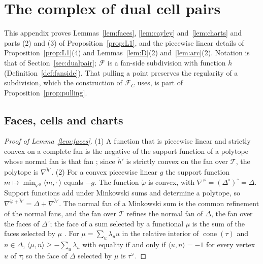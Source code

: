 \section{The complex of dual cell pairs}\label{app:legendre}

This appendix proves Lemmas~\ref{lem:faces}, \ref{lem:cayley} and~\ref{lem:charts} and parts (2) and (3) of
Proposition~\ref{prop:L1}, and the piecewise linear details of Proposition~\ref{prop:L1}(4) and Lemmas~\ref{lem:D}(2) and~\ref{lem:arc}(2). Notation is that of
Section~\ref{sec:dualpair}; $\mathcal F$ is a fan-side subdivision with function $h$ (Definition~\ref{def:fanside}). That pulling a point
preserves the regularity of a subdivision, which the construction of $\mathcal F_C$ uses, is part of
Proposition~\ref{prop:pulling}.

\subsection{Faces, cells and charts}\label{app:leg-faces}
\begin{proof}[Proof of Lemma~\ref{lem:faces}]
(1) A function that is piecewise linear and strictly convex on a complete fan is the negative of the support function of
a polytope whose normal fan is that fan \cite[\S6.1]{CLS}; since $\check h'$ is strictly convex on the fan over $\mathcal T$,
the polytope is $\nabla^{\check h'}$. (2) For a convex piecewise linear $g$ the support function
$m\mapsto\min_{\nabla^g}\langle m,\cdot\,\rangle$ equals $-g$. The function $\check\varphi$ is convex, with
$\nabla^{\check\varphi}=(\Delta^\circ)^\circ=\Delta$. Support functions add under Minkowski sums and determine a polytope, so
$\nabla^{\check\varphi+\check h'}=\Delta+\nabla^{\check h'}$. The normal fan of a Minkowski sum is the common refinement of
the normal fans, and the fan over $\mathcal T$ refines the normal fan of $\Delta$, the fan over the faces of
$\Delta^\circ$; the face of a sum selected by a functional $\mu$ is the sum of the faces selected by $\mu$
\cite[Lecture~7]{Ziegler}. For $\mu=\sum_u\lambda_uu$ in the relative interior of $\operatorname{cone}(\tau)$ and
$n\in\Delta$, $\langle\mu,n\rangle\ge-\sum_u\lambda_u$ with equality if and only if $\langle u,n\rangle=-1$ for every vertex
$u$ of $\tau$; so the face of $\Delta$ selected by $\mu$ is $\tau^\vee$.
\end{proof}

